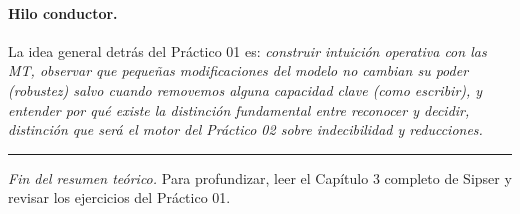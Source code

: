 \documentclass[11pt,a4paper]{article}
\theoremstyle{plain}
\theoremstyle{definition}
\theoremstyle{remark}
\begin{document}
\paragraph{Hilo conductor.} La idea general detr\'as del Pr\'actico 01 es:
\emph{construir intuici\'on operativa con las MT, observar que peque\~nas
modificaciones del modelo no cambian su poder (robustez) salvo cuando
removemos alguna capacidad clave (como escribir), y entender por qu\'e existe
la distinci\'on fundamental entre reconocer y decidir, distinci\'on que
ser\'a el motor del Pr\'actico 02 sobre indecibilidad y reducciones.}

\bigskip
\hrule
\medskip
\begin{center}
\small
\emph{Fin del resumen te\'orico.} Para profundizar, leer el Cap\'itulo 3
completo de Sipser y revisar los ejercicios del Pr\'actico 01.
\end{center}
\end{document}
